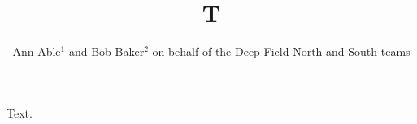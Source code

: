 \documentclass{article}
\begin{document}
\title{T}
\author{Ann Able$^1$ and Bob Baker$^2$ on behalf of the Deep Field North and South teams}
\maketitle
Text.
\end{document}
